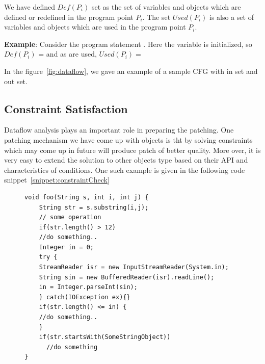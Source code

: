 We have defined $Def(P_i)$ set as the set of variables and objects which are
defined or redefined in the program point $P_i$. The set $Used(P_i)$ is also a
set of variables and objects which are used in the program point $P_i$.

\textbf{Example}: Consider the program statement .
Here the variable  is initialized, so $Def(P_i)$ =  and
as
 are used, $Used(P_i) =$ 

In the figure~\ref{fig:dataflow}, we gave an example of a sample CFG with in set
and out set.

\subsection{Constraint Satisfaction}
\label{subsec:constraintSatisfaction}

Dataflow analysis plays an important role in preparing the patching. One
patching mechanism we have come up with  objects is tht by
solving constraints which may come up in future will produce patch of better
quality. More over, it is very easy to extend the solution to other objects type
based on their API and characteristics of conditions. One such example is given
in the following code snippet~\ref{snippet:constraintCheck}


\lstset{language=Java, caption=Better patching mechanism with constraint
satisfaction, label = snippet:constraintCheck}
\begin{figure}[t]
\begin{lstlisting}
void foo(String s, int i, int j) {
    String str = s.substring(i,j);
    // some operation
    if(str.length() > 12)
	//do something..
    Integer in = 0;
    try {
	StreamReader isr = new InputStreamReader(System.in);
	String sin = new BufferedReader(isr).readLine();
	in = Integer.parseInt(sin);
    } catch(IOException ex){}
    if(str.length() <= in) {
	//do something..
    }
    if(str.startsWith(SomeStringObject))
      //do something
}
\end{lstlisting}
\end{figure}

